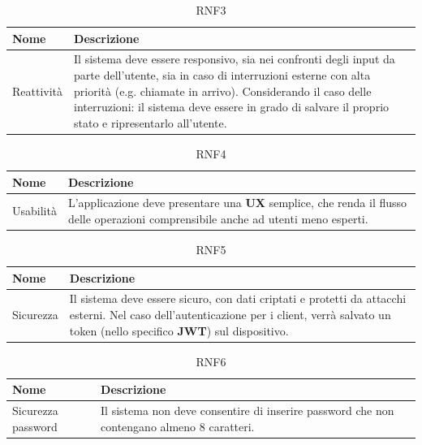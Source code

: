 \documentclass{natourDoc}
\begin{document}
\begin{table}[H]
	\centering
	\begin{tabular}{ |p{5cm}|p{10.3cm}| }
		\hline
		\rowcolor{PineGreen!70}
		\textbf{Nome} & \textbf{Descrizione}                                                                                             \\
		\hline
		Reattività    & Il sistema deve essere responsivo, sia nei confronti degli input da parte dell'utente, sia
		in caso di interruzioni esterne con alta priorità (e.g. chiamate in arrivo).
		Considerando il caso delle interruzioni: il sistema deve essere in grado di salvare il proprio stato e ripresentarlo all'utente. \\
		\hline
	\end{tabular}
	\caption{RNF3}
\end{table}

\begin{table}[H]
	\centering
	\begin{tabular}{ |p{5cm}|p{10.3cm}| }
		\hline
		\rowcolor{PineGreen!70}
		\textbf{Nome} & \textbf{Descrizione}                                                                              \\
		\hline
		Usabilità     & L'applicazione deve presentare una \textbf{UX} semplice, che renda il flusso delle operazioni
		comprensibile anche ad utenti meno esperti.                                                                      \\
		\hline
	\end{tabular}
	\caption{RNF4}
\end{table}

\begin{table}[H]
	\centering
	\begin{tabular}{ |p{5cm}|p{10.3cm}| }
		\hline
		\rowcolor{PineGreen!70}
		\textbf{Nome} & \textbf{Descrizione}                                                                              \\
		\hline
		Sicurezza     & Il sistema deve essere sicuro, con dati criptati e protetti da attacchi esterni.
		Nel caso dell'autenticazione per i client, verrà salvato un token (nello specifico \textbf{JWT}) sul dispositivo. \\
		\hline
	\end{tabular}
	\caption{RNF5}
\end{table}

\begin{table}[H]
	\centering
	\begin{tabular}{ |p{5cm}|p{10.3cm}| }
		\hline
		\rowcolor{PineGreen!70}
		\textbf{Nome}      & \textbf{Descrizione}                                            \\
		\hline
		Sicurezza password & Il sistema non deve consentire di inserire password che non contengano
		almeno 8 caratteri.                                                                  \\
		\hline
	\end{tabular}
	\caption{RNF6}
\end{table}
\end{document}
